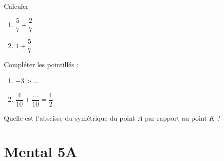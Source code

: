 \begin{MentalActivity}
    \begin{mental}
        Calculer
        \begin{enumerate}
            \item
                \( \dfrac{ 5 }{ 7 }+\dfrac{ 2 }{ 7 }\)
            \item
                \( 1+\dfrac{ 5 }{ 7 }\)
        \end{enumerate}
    \end{mental}
    \begin{mental}
        Compléter les pointillés :
        \begin{enumerate}
            \item
                \( -3> \ldots\)
            \item
                \( \dfrac{ 4 }{ 10 }+\dfrac{ \ldots }{ 10 }=\dfrac{ 1 }{2}\)
        \end{enumerate}
    \end{mental}
    \begin{mental}
        Quelle est l'abscisse du symétrique du point \( A\) par rapport au point \( K\) ?
        \begin{center}
            \Large
            
        \end{center}
    \end{mental}
\end{MentalActivity}


\begin{MentalActivity}          


\end{MentalActivity}

\section{Mental 5A}
\setcounter{numactivmentale}{0}

\begin{MentalActivity}  


\end{MentalActivity}

